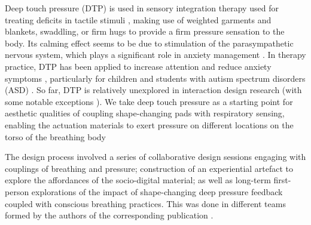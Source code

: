 Deep touch pressure (DTP) is used in sensory integration therapy used for treating deficits in tactile stimuli \cite{bundy_sensory_2002}, making use of weighted garments and blankets, swaddling, or firm hugs to provide a firm pressure sensation to the body. Its calming effect seems to be due to stimulation of the parasympathetic nervous system, which plays a significant role in anxiety management \cite{hsin-yung_chen_physiological_2013}. In therapy practice, DTP has been applied to increase attention \cite{fertel-daly_effects_2001} and reduce anxiety symptoms \cite{krauss_effects_1987}, particularly for children and students with autism spectrum disorders (ASD) \cite{lang_sensory_2012} \cite{alfaras_espinas_making_2021}. So far, DTP is relatively unexplored in interaction design research (with some notable exceptions \cite{delazio_force_2018, duvall_dynamic_2019, foo_user_2019, foo_soft_2020}). We take deep touch pressure as a starting point for aesthetic qualities of coupling shape-changing pads with respiratory sensing, enabling the actuation materials to exert pressure on different locations on the torso of the breathing body

The design process involved a series of collaborative design sessions engaging with couplings of breathing and pressure; construction of an experiential artefact \cite{sundstrom_experiential_2011} to explore the affordances of the socio-digital material; as well as long-term first-person explorations of the impact of shape-changing deep pressure feedback coupled with conscious breathing practices. This was done in different teams formed by the authors of the corresponding publication \cite{jung_exploring_2021}. 

